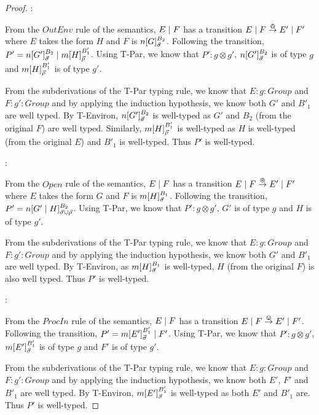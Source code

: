 \begin{proof}
:

\noindent From the $OutEnv$ rule of the semantics, $E \;|\; F$ has a
transition $E \;|\; F \stackrel{\varowedge}{\rightarrow} E' \;|\; F'$ where $E$ takes the
form $H$ and $F$ is ${n}[ G ]^{B_2}_{\vec{\sigma}}$.  Following the
transition, $P' = {n}[ G' ]^{B_2}_{\vec{\sigma}} \;|\;
{m}[ H ]^{B'_1}_{\vec{\rho}}$.  Using T-Par, we know that $P' : g
  \otimes g'$, ${n}[ G' ]^{B_2}_{\vec{\sigma}}$ is of type $g$ and
    ${m}[ H ]^{B'_1}_{\vec{\rho}}$ is of type $g'$.

From the subderivations of the T-Par typing rule, we know that $E :
g : Group$ and $F : g' : Group$ and by applying the induction
hypothesis, we know both $G'$ and $B'_1$ are well typed.  By
T-Environ, ${n}[ G' ]^{B_2}_{\vec{\sigma}}$ is well-typed as $G'$
and $B_2$ (from the original $F$) are well typed.  Similarly,
${m}[ H ]^{B'_1}_{\vec{\rho}}$ is well-typed as $H$ is well-typed
(from the original $E$) and $B'_1$ is well-typed.  Thus $P'$ is
well-typed.

:

\noindent From the $Open$ rule of the semantics, $E \;|\; F$ has a
transition $E \;|\; F \stackrel{\varoast}{\rightarrow} E' \;|\; F'$ where $E$ takes the
form $G$ and $F$ is ${m}[ H ]^{B_1}_{\vec{\sigma}}$.  Following the
transition, $P' = {n}[ G' \;|\; H ]^{B_2}_{\vec{\sigma} \cup
  \vec{\rho}}$.  Using T-Par, we know that $P' : g \otimes g'$, $G'$
is of type $g$ and $H$ is of type $g'$.

From the subderivations of the T-Par typing rule, we know that $E : g
: Group$ and $F : g' : Group$ and by applying the induction
hypothesis, we know both $G'$ and $B'_1$ are well typed.  By
T-Environ, as ${m}[ H ]^{B_1}_{\vec{\sigma}}$ is well-typed, $H$
(from the original $F$) is also well typed. Thus $P'$ is
well-typed.

:

\noindent From the $ProcIn$ rule of the semantics, $E \;|\; F$ has a
transition $E \;|\; F \stackrel{\varovee}{\rightarrow} E' \;|\; F'$.  Following the
transition, $P' = {m}[ E' ]^{B'_1}_{\vec{\sigma}} \;|\; F'$.  Using
T-Par, we know that $P' : g \otimes g'$,
${m}[ E' ]^{B'_1}_{\vec{\sigma}}$ is of type $g$ and $F'$ is of type
$g'$.

From the subderivations of the T-Par typing rule, we know that $E : g
: Group$ and $F : g' : Group$ and by applying the induction
hypothesis, we know both $E'$, $F'$ and $B'_1$ are well typed.  By
T-Environ, ${m}[ E' ]^{B'_1}_{\vec{\sigma}}$ is well-typed as both
$E'$ and $B'_1$ are.  Thus $P'$ is well-typed.


\end{proof}

